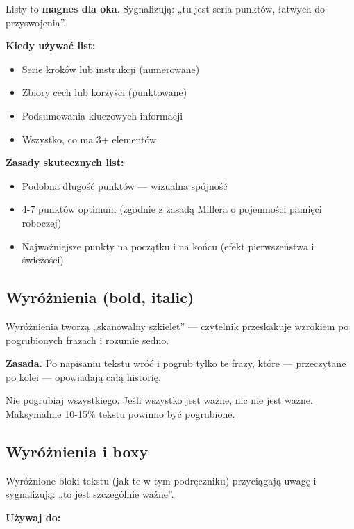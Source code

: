 \documentclass[
  12pt,
  a4paper,
  twoside,
  openright,
  12pt,
  DIV=12,
  BCOR=12mm]{scrbook}
\providecommand{\tightlist}{%
  \setlength{\itemsep}{0pt}\setlength{\parskip}{0pt}}\usepackage{longtable,booktabs,array}
\begin{document}
Listy to \textbf{magnes dla oka}. Sygnalizują: „tu jest seria punktów,
łatwych do przyswojenia''.

\textbf{Kiedy używać list:}

\begin{itemize}
\tightlist
\item
  Serie kroków lub instrukcji (numerowane)
\item
  Zbiory cech lub korzyści (punktowane)
\item
  Podsumowania kluczowych informacji
\item
  Wszystko, co ma 3+ elementów
\end{itemize}

\textbf{Zasady skutecznych list:}

\begin{itemize}
\tightlist
\item
  Podobna długość punktów --- wizualna spójność
\item
  4-7 punktów optimum (zgodnie z zasadą Millera o pojemności pamięci
  roboczej)
\item
  Najważniejsze punkty na początku i na końcu (efekt pierwszeństwa i
  świeżości)
\end{itemize}

\subsection{Wyróżnienia (bold,
italic)}\label{wyruxf3ux17cnienia-bold-italic}

Wyróżnienia tworzą „skanowalny szkielet'' --- czytelnik przeskakuje
wzrokiem po pogrubionych frazach i rozumie sedno.

\textbf{Zasada.} Po napisaniu tekstu wróć i pogrub tylko te frazy, które
--- przeczytane po kolei --- opowiadają całą historię.

\begin{uwaga}
Nie pogrubiaj wszystkiego. Jeśli wszystko jest ważne, nic nie jest ważne. Maksymalnie 10-15\% tekstu powinno być pogrubione.
\end{uwaga}

\subsection{Wyróżnienia i boxy}\label{wyruxf3ux17cnienia-i-boxy}

Wyróżnione bloki tekstu (jak te w tym podręczniku) przyciągają uwagę i
sygnalizują: „to jest szczególnie ważne''.

\textbf{Używaj do:}
\end{document}
